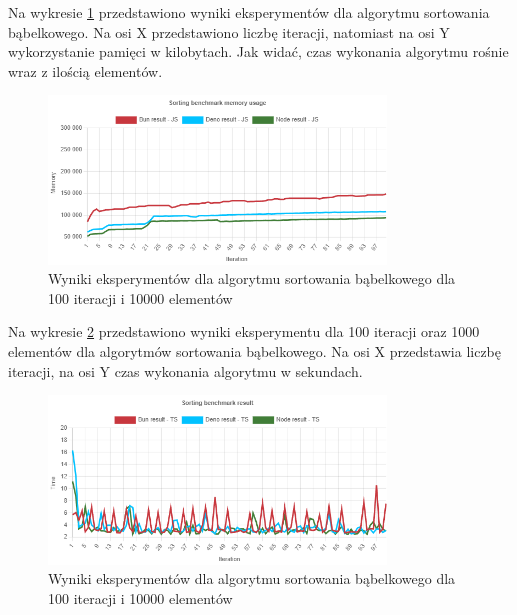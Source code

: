 Na wykresie \ref{fig:quick_sorting_e5_memory_js} przedstawiono wyniki eksperymentów dla algorytmu sortowania bąbelkowego. Na osi X przedstawiono liczbę iteracji, natomiast na osi Y wykorzystanie pamięci w kilobytach. Jak widać, czas wykonania algorytmu rośnie wraz z ilością elementów.
\begin{figure}[H]
  \centering
  \includegraphics[width=0.8\textwidth]{Figures/sorting/quick/e5_memory_js.png}
  \caption{Wyniki eksperymentów dla algorytmu sortowania bąbelkowego dla 100 iteracji i 10000 elementów}
  \label{fig:quick_sorting_e5_memory_js}
\end{figure}

Na wykresie \ref{fig:quick_sorting_e5_ts} przedstawiono wyniki eksperymentu dla 100 iteracji oraz 1000 elementów dla algorytmów sortowania bąbelkowego. Na osi X przedstawia liczbę iteracji, na osi Y czas wykonania algorytmu w sekundach. 

\begin{figure}[H]
  \centering
  \includegraphics[width=0.8\textwidth]{Figures/sorting/quick/e5_ts.png}
  \caption{Wyniki eksperymentów dla algorytmu sortowania bąbelkowego dla 100 iteracji i 10000 elementów}
  \label{fig:quick_sorting_e5_ts}
\end{figure}

